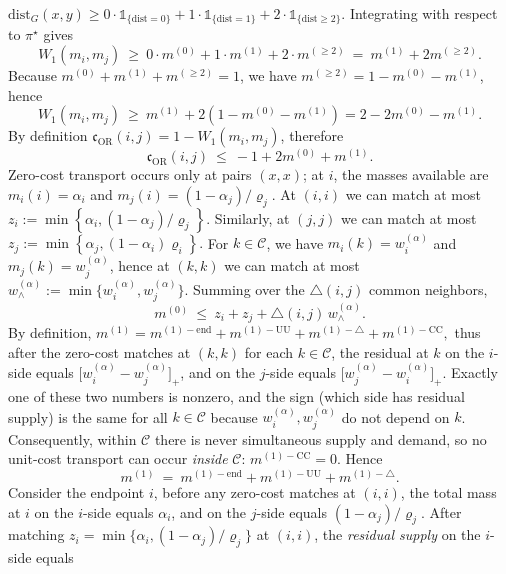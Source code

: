 \documentclass[twoside,11pt]{article}
\numberwithin{equation}{section}
\numberwithin{theorem}{section}
\numberwithin{example}{section}
\begin{document}
\(
\mathrm{dist}_G(x,y) \ge 0\cdot \mathds 1_{\{\mathrm{dist}=0\}}
+ 1\cdot \mathds 1_{\{\mathrm{dist}=1\}}
+ 2\cdot \mathds 1_{\{\mathrm{dist}\ge 2\}}.
\)
Integrating with respect to $\pi^\star$ gives
\begin{equation*}
W_1(m_i,m_j)\ \ge\ 0\cdot m^{(0)}+1\cdot m^{(1)}+2\cdot m^{(\ge 2)}
\ =\ m^{(1)}+2m^{(\ge 2)}.
\end{equation*}
Because $m^{(0)}+m^{(1)}+m^{(\ge 2)}=1$, we have $m^{(\ge 2)}=1-m^{(0)}-m^{(1)}$, hence
\[
W_1(m_i,m_j)\ \ge\ m^{(1)}+2(1-m^{(0)}-m^{(1)})=2-2m^{(0)}-m^{(1)}.
\]
By definition $\mathfrak c_{\mathrm{OR}}(i,j)=1-W_1(m_i,m_j)$, therefore
\begin{equation}
\label{eq:curv-master}
\mathfrak c_{\mathrm{OR}}(i,j)\ \le\ -1+2m^{(0)}+m^{(1)}.
\end{equation}
Zero-cost transport occurs only at pairs $(x,x)$; at $i$, the masses available are $m_i(i)=\alpha_i$ and $m_j(i)=(1-\alpha_j)/\varrho_j$.
At $(i,i)$ we can match at most 
\(
z_i:=\min\!\left\{\alpha_i,({1-\alpha_j})/{\varrho_j}\right\}.
\)
Similarly, at $(j,j)$ we can match at most 
\(
z_j:=\min\!\left\{\alpha_j,{(1-\alpha_i)}{\varrho_i}\right\}.
\)
For $k\in\mathcal C$, we have $m_i(k)=w^{(\alpha)}_i$ and $m_j(k)=w^{(\alpha)}_j$, hence at $(k,k)$ we can match at most $w^{(\alpha)}_\wedge:=\min\{w^{(\alpha)}_i,w^{(\alpha)}_j\}$. Summing over the $\triangle(i,j)$ common neighbors,
\begin{equation}
\label{eq:m0-upper}
m^{(0)}\ \le\ z_i+z_j+\triangle(i,j)\,w^{(\alpha)}_\wedge.
\end{equation}
By definition,
\(
m^{(1)}=m^{(1)-\mathrm{end}} + m^{(1)-\mathrm{UU}} + m^{(1)-\triangle} + m^{(1)-\mathrm{CC}},
\)
thus after the zero-cost matches at $(k,k)$ for each $k\in\mathcal C$, the residual at $k$ on the $i$-side equals $\bigl[w^{(\alpha)}_i-w^{(\alpha)}_j\bigr]_+$, and on the $j$-side equals $\bigl[w^{(\alpha)}_j-w^{(\alpha)}_i\bigr]_+$. Exactly one of these two numbers is nonzero, and the sign (which side has residual supply) is the same for all $k\in\mathcal C$ because $w^{(\alpha)}_i,w^{(\alpha)}_j$ do not depend on $k$. Consequently, within $\mathcal C$ there is never simultaneous supply and demand, so no unit-cost transport can occur \emph{inside} $\mathcal C$:
\(
m^{(1)-\mathrm{CC}}=0.
\)
Hence
\begin{equation}
\label{eq:m1-decomp}
m^{(1)}\ =\ m^{(1)-\mathrm{end}}+m^{(1)-\mathrm{UU}}+m^{(1)-\triangle}.
\end{equation}
Consider the endpoint $i$, before any zero-cost matches at $(i,i)$, the total mass at $i$ on the $i$-side equals $\alpha_i$, and on the $j$-side equals $(1-\alpha_j)/\varrho_j$. After matching $z_i=\min\{\alpha_i,(1-\alpha_j)/\varrho_j\}$ at $(i,i)$, the \emph{residual supply} on the $i$-side equals
\end{document}
